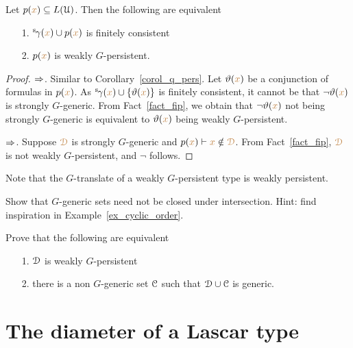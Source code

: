 \begin{corollary}\label{corol_q_w_pers}
  Let $p({\color{brown} x})\subseteq L(\EuScript U)$.
  Then the following are equivalent
  \begin{itemize}
    \item [1.] ${}^{\rm s}\kern-.2ex\gamma({\color{brown} x})\cup p({\color{brown} x})$ is finitely consistent
    \item [2.] $p({\color{brown} x})$ is weakly $G$-persistent.
  \end{itemize}
\end{corollary}

\begin{proof}
  $\Rightarrow$. Similar to Corollary~\ref{corol_q_pers}.
  Let $\vartheta({\color{brown} x})$ be a conjunction of formulas in $p({\color{brown} x})$.
  As ${}^{\rm s}\kern-.2ex\gamma({\color{brown} x})\cup\{\vartheta({\color{brown} x})\}$ is finitely consistent, it cannot be that $\neg\vartheta({\color{brown} x})$ is strongly $G$-generic.
  From Fact~\ref{fact_fip}, we obtain that $\neg\vartheta({\color{brown} x})$ not being strongly $G$-generic is equivalent to $\vartheta({\color{brown} x})$ being weakly $G$-persistent.

  $\Rightarrow$. 
  Suppose ${\color{brown}\EuScript D}$ is strongly $G$-generic and $p({\color{brown} x})\vdash{\color{brown}x}\notin{\color{brown}\EuScript D}$.
  From Fact~\ref{fact_fip}, ${\color{brown}\EuScript D}$ is not weakly $G$-persistent, and $\neg$ follows.
\end{proof}

Note that 
the $G$-translate of a weakly $G$-persistent type is weakly persistent.

\begin{exercise}
  Show that $G$-generic sets need not be closed under intersection.
  Hint: find inspiration in Example~\ref{ex_cyclic_order}.
\end{exercise}

\begin{exercise}
  Prove that the following are equivalent
  \begin{itemize}
    \item [1.] $\EuScript D$ is weakly $G$-persistent
    \item [2.] there is a non $G$-generic set $\EuScript C$ such that $\EuScript D\cup\EuScript C$ is generic.
  \end{itemize}
\end{exercise}

\section{The diameter of a Lascar type}\label{newelski}

